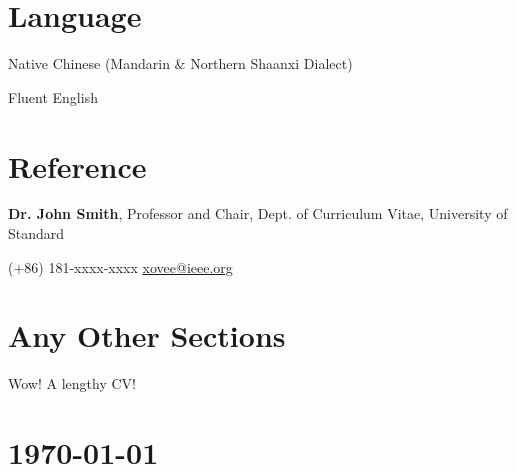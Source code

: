 \documentclass{article}
\newcommand{\cvsection}[1]{\section*{\rmfamily#1}}
\begin{document}









\cvsection{Language}
\indent

Native Chinese (Mandarin \& Northern Shaanxi Dialect)

Fluent English




\cvsection{Reference}
\indent

\textbf{Dr. John Smith}, Professor and Chair, Dept. of Curriculum Vitae, University of Standard

\hspace{2em}(+86) 181-xxxx-xxxx \hspace{2em} \url{xovee@ieee.org}


\cvsection{Any Other Sections}
\indent 

Wow! A lengthy CV!


\vfill

\section*{\hfill\color{OliveGreen}\today}
\end{document}
